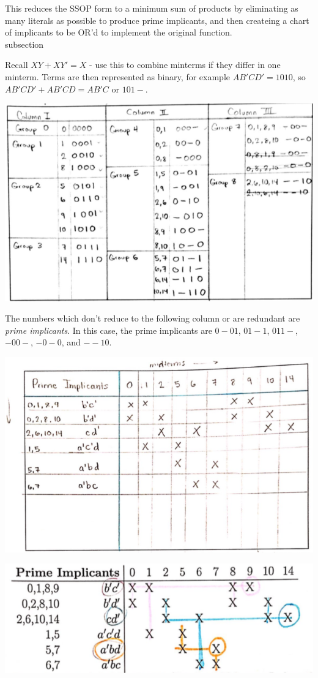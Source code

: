 \documentclass[11pt]{article}
\begin{document}
    This reduces the SSOP form to a minimum sum of products by eliminating as many literals as possible to produce prime implicants, and then createing a chart of implicants to be OR'd to implement the original function. \\subsection{
        
    Recall $XY + XY' = X$ - use this to combine minterms if they differ in one minterm. Terms are then represented as binary, for example $AB'CD' = 1010$, so $AB'CD' + AB'CD = AB'C$ or $101-$.

    \begin{center}
        \includegraphics[width=300 px]{quine} 
    \end{center} 

    The numbers which don't reduce to the following column or are redundant are \textit{prime implicants}. In this case, the prime implicants are $0-01$, $01-1$, $011-$, $-00-$, $-0-0$, and $--10$.

    \begin{center}
        \includegraphics[width=300 px]{implicants} 
    \end{center} 

    \begin{center}
        \includegraphics[width=300 px]{implicants2} 
    \end{center} 

}
\end{document}
